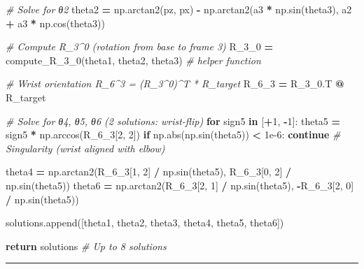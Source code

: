 \documentclass[
]{article}
\newenvironment{Shaded}{\begin{snugshade}}{\end{snugshade}}
\newcommand{\BuiltInTok}[1]{#1}
\newcommand{\CommentTok}[1]{\textcolor[rgb]{0.56,0.35,0.01}{\textit{#1}}}
\newcommand{\ControlFlowTok}[1]{\textcolor[rgb]{0.13,0.29,0.53}{\textbf{#1}}}
\newcommand{\DecValTok}[1]{\textcolor[rgb]{0.00,0.00,0.81}{#1}}
\newcommand{\FloatTok}[1]{\textcolor[rgb]{0.00,0.00,0.81}{#1}}
\newcommand{\KeywordTok}[1]{\textcolor[rgb]{0.13,0.29,0.53}{\textbf{#1}}}
\newcommand{\NormalTok}[1]{#1}
\newcommand{\OperatorTok}[1]{\textcolor[rgb]{0.81,0.36,0.00}{\textbf{#1}}}
\begin{document}
\begin{Shaded}
\begin{Highlighting}[]
            \CommentTok{\# Solve for θ2}
\NormalTok{            theta2 }\OperatorTok{=}\NormalTok{ np.arctan2(pz, px) }\OperatorTok{{-}}\NormalTok{ np.arctan2(a3 }\OperatorTok{*}\NormalTok{ np.sin(theta3), a2 }\OperatorTok{+}\NormalTok{ a3 }\OperatorTok{*}\NormalTok{ np.cos(theta3))}

            \CommentTok{\# Compute R\_3\^{}0 (rotation from base to frame 3)}
\NormalTok{            R\_3\_0 }\OperatorTok{=}\NormalTok{ compute\_R\_3\_0(theta1, theta2, theta3)  }\CommentTok{\# helper function}

            \CommentTok{\# Wrist orientation R\_6\^{}3 = (R\_3\^{}0)\^{}T * R\_target}
\NormalTok{            R\_6\_3 }\OperatorTok{=}\NormalTok{ R\_3\_0.T }\OperatorTok{@}\NormalTok{ R\_target}

            \CommentTok{\# Solve for θ4, θ5, θ6 (2 solutions: wrist{-}flip)}
            \ControlFlowTok{for}\NormalTok{ sign5 }\KeywordTok{in}\NormalTok{ [}\OperatorTok{+}\DecValTok{1}\NormalTok{, }\OperatorTok{{-}}\DecValTok{1}\NormalTok{]:}
\NormalTok{                theta5 }\OperatorTok{=}\NormalTok{ sign5 }\OperatorTok{*}\NormalTok{ np.arccos(R\_6\_3[}\DecValTok{2}\NormalTok{, }\DecValTok{2}\NormalTok{])}
                \ControlFlowTok{if}\NormalTok{ np.}\BuiltInTok{abs}\NormalTok{(np.sin(theta5)) }\OperatorTok{\textless{}} \FloatTok{1e{-}6}\NormalTok{:}
                    \ControlFlowTok{continue}  \CommentTok{\# Singularity (wrist aligned with elbow)}

\NormalTok{                theta4 }\OperatorTok{=}\NormalTok{ np.arctan2(R\_6\_3[}\DecValTok{1}\NormalTok{, }\DecValTok{2}\NormalTok{] }\OperatorTok{/}\NormalTok{ np.sin(theta5), R\_6\_3[}\DecValTok{0}\NormalTok{, }\DecValTok{2}\NormalTok{] }\OperatorTok{/}\NormalTok{ np.sin(theta5))}
\NormalTok{                theta6 }\OperatorTok{=}\NormalTok{ np.arctan2(R\_6\_3[}\DecValTok{2}\NormalTok{, }\DecValTok{1}\NormalTok{] }\OperatorTok{/}\NormalTok{ np.sin(theta5), }\OperatorTok{{-}}\NormalTok{R\_6\_3[}\DecValTok{2}\NormalTok{, }\DecValTok{0}\NormalTok{] }\OperatorTok{/}\NormalTok{ np.sin(theta5))}

\NormalTok{                solutions.append([theta1, theta2, theta3, theta4, theta5, theta6])}

    \ControlFlowTok{return}\NormalTok{ solutions  }\CommentTok{\# Up to 8 solutions}
\end{Highlighting}
\end{Shaded}

\begin{center}\rule{0.5\linewidth}{0.5pt}\end{center}
\end{document}
